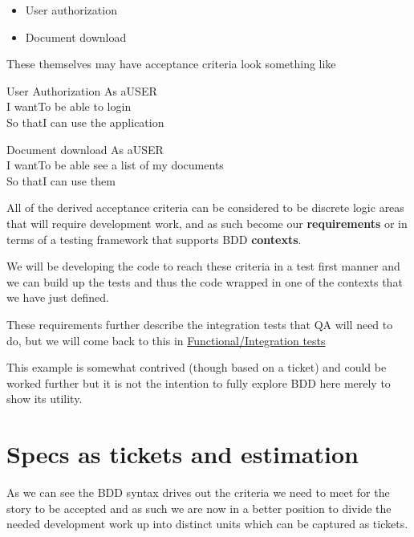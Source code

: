 \documentclass[a4paper, titlepage]{article}
\begin{document}
  \begin{itemize}
    \item{User authorization}
    \item{Document download}
  \end{itemize}

  These themselves may have acceptance criteria look something like

  \begin{tspec}{1}{User Authorization}
    \ac{As a}{USER}\\
    \ac{I want}{To be able to login}\\
    \ac{So that}{I can use the application}
  \end{tspec}

  \begin{tspec}{1}{Document download}
    \ac{As a}{USER}\\
    \ac{I want}{To be able see a list of my documents}\\
    \ac{So that}{I can use them}\\
  \end{tspec}

  All of the derived acceptance criteria can be considered to be discrete
  logic areas that will require development work, and as such become 
  our \textbf{requirements} or in terms of a testing framework that supports BDD 
  \textbf{contexts}.
  
  We will be developing the code to reach these criteria in a test
  first manner and we can build up the tests and thus the code wrapped
  in one of the contexts that we have just defined.

  These requirements further describe the integration tests
  that QA will need to do, but we will come back to this in \hyperref[sec:integration tests]{Functional/Integration tests}
  
  This example is somewhat contrived (though based on a ticket) and could 
  be worked further but it is not the intention to
  fully explore BDD here merely to show its utility.

\section{Specs as tickets and estimation}
  As we can see the BDD syntax drives out the criteria we need to meet
  for the story to be accepted and as such we are now in a better
  position to divide the needed development work up into distinct units which can be
  captured as tickets.
\end{document}
